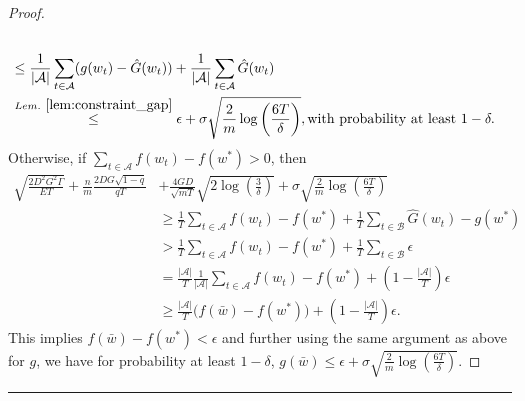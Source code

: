 \documentclass{article} %
\def\A{{\mathcal A}}
\def\B{{\mathcal B}}
\begin{document}
\begin{proof}
\begin{align*}
        \\
        & \leq \frac{1}{|\A|} \sum_{t\in \A}(g(w_t) - \hat{G}(w_t)) + \frac{1}{|\A|} \sum_{t\in \A}\hat{G}(w_t)
        \\
        &\overset{Lem.~\ref{lem:constraint_gap}}{\leq} \epsilon + \sigma \sqrt{\frac{2}{m} \log\left(\frac{6T}{\delta}\right)}, \text{with probability at least } 1-\delta.
    \end{align*}
    Otherwise, if $\sum_{t\in \A} f(w_t)-f(w^*) >0$, then
    \begin{equation}\label{eq:fedhbisgm_partial}
        \begin{aligned}
          \sqrt{\frac{{2 D^2 G^2 \Gamma}}{{E T}}} + \frac{n}{m}\frac{2 DG\sqrt{1-q}}{qT}
            &+ \frac{4GD}{\sqrt{mT}}\sqrt{2\log\left(\frac{3}{\delta}\right)}
            +  \sigma\sqrt{\frac{2}{m} \log\left(\frac{6T}{\delta}\right)}  
            \\
            &\geq \frac{1}{T} \sum_{t\in \A} f(w_t)-f(w^*) +\frac{1}{T} \sum_{t\in \B} \hat{G}(w_t)-g(w^*)\\&>\frac{1}{T} \sum_{t\in \A} f(w_t)-f(w^*) +\frac{1}{T} \sum_{t\in \B} \epsilon\\&=\frac{|\A|}{T}  \frac{1}{|\A|}\sum_{t\in \A} f(w_t)-f(w^*) +(1-\frac{|\A|}{T}) \epsilon\\&\geq\frac{|\A|}{T} \big( f(\bar{w})-f(w^*) \big)+(1-\frac{|\A|}{T}) \epsilon .
        \end{aligned}
    \end{equation}
    This implies $f(\bar{w})-f(w^*)<\epsilon$ and further using the same argument as above for $g$, we have for probability at least $1-\delta$, $g(\bar{w}) \leq \epsilon + \sigma\sqrt{\frac{2}{m}\log\left(\frac{6T}{\delta}\right)}.$
\end{proof}
\hrule
\end{document}
